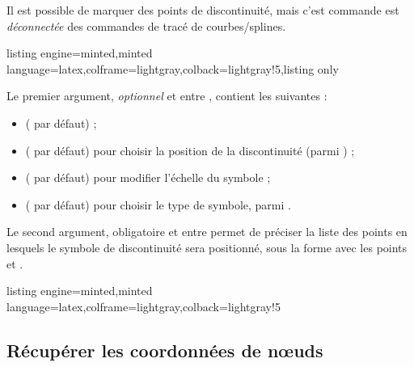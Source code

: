 \documentclass[11pt,a4paper]{ltxdoc}
\begin{document}
Il est possible de marquer des points de discontinuité, mais c'est commande est \textit{déconnectée} des commandes de tracé de courbes/splines.

\begin{tcblisting}{listing engine=minted,minted language=latex,colframe=lightgray,colback=lightgray!5,listing only}
\end{tcblisting}

Le premier argument, \textit{optionnel} et entre \MontreCode{[...]}, contient les  suivantes :

\begin{itemize}
	\item {} ( par défaut) ;
	\item {} ( par défaut) pour choisir la position de la discontinuité (parmi ) ;
	\item {} ( par défaut) pour modifier l'échelle du symbole ;
	\item {} ( par défaut) pour choisir le type de symbole, parmi .
\end{itemize}

Le second argument, obligatoire et entre  permet de préciser la liste des points en lesquels le symbole de discontinuité sera positionné, sous la forme  avec les points  et .

\begin{tcblisting}{listing engine=minted,minted language=latex,colframe=lightgray,colback=lightgray!5}
\begin{GraphiqueTikz}[x=1cm,y=1cm,Xmin=0,Xmax=10,Ymin=0,Ymax=5]
\end{GraphiqueTikz}
\end{tcblisting}

\subsection{Récupérer les coordonnées de nœuds}\label{recupcoordo}
\end{document}
